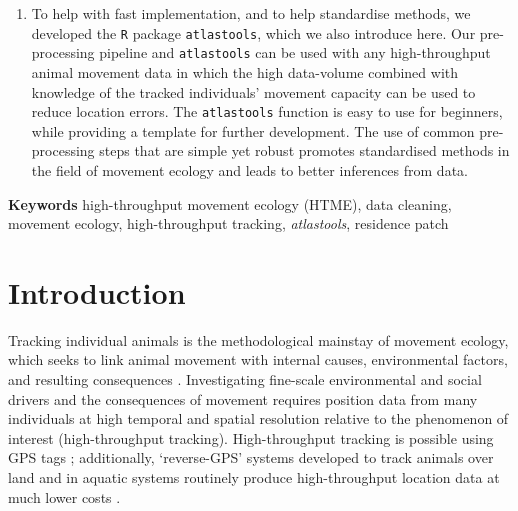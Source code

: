 \documentclass[10pt,paper=a4,headings=standardclasses
]{scrartcl}
\begin{document}
\begin{enumerate}
    \item To help with fast implementation, and to help standardise methods, we developed the \texttt{R} package \texttt{atlastools}, which we also introduce here.
    Our pre-processing pipeline and \texttt{atlastools} can be used with any high-throughput animal movement data in which the high data-volume combined with knowledge of the tracked individuals’ movement capacity can be used to reduce location errors.
    The \texttt{atlastools} function is easy to use for beginners, while providing a template for further development.
    The use of common pre-processing steps that are simple yet robust promotes standardised methods in the field of movement ecology and leads to better inferences from data.
\end{enumerate}

\textbf{Keywords} high-throughput movement ecology (HTME), data cleaning, movement ecology, high-throughput tracking, \textit{atlastools}, residence patch

\linenumbers

\section{Introduction}

Tracking individual animals is the methodological mainstay of movement ecology, which seeks to link animal movement with internal causes, environmental factors, and resulting consequences \citep{nathan2008a, holyoak2008}. 
Investigating fine-scale environmental and social drivers and the consequences of movement requires position data from many individuals at high temporal and spatial resolution relative to the phenomenon of interest (high-throughput tracking).
High-throughput tracking is possible using GPS tags \citep[see recent examples in][]{strandburg-peshkin2015, papageorgiou2019, harel2016}; additionally, ‘reverse-GPS’ systems developed to track animals over land \citep{toledo2014, weiser2016, toledo2016,toledo2020, maccurdy2009, maccurdy2019} and in aquatic systems \citep{hussey2015, baktoft2019, baktoft2017,jung2015, aspillaga2021} routinely produce high-throughput location data at much lower costs \citep{wikelski2007}.
\end{document}
